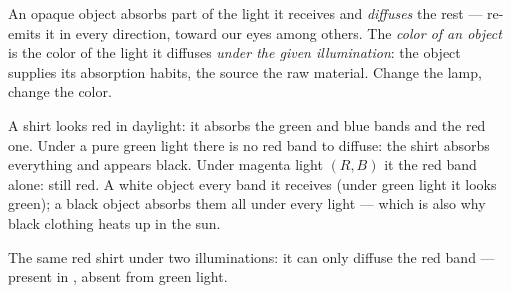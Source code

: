 \begin{definition}\label{def:g11:color-light-sources:objectcolor}
An opaque object absorbs part of the light it receives and
\emph{diffuses} the rest --- re-emits it in every
direction, toward our eyes among others. The \emph{color of an
object} is the color of the light it diffuses
\emph{under the given illumination}: the object supplies its absorption
habits, the source the raw material. Change the lamp, change the color.
\end{definition}

\begin{example}\label{ex:g11:color-light-sources:redshirt}
A shirt looks red in daylight: it absorbs the green and blue bands and
 the red one. Under a pure green light there is no red band to
diffuse: the shirt absorbs everything and appears black. Under magenta
light $(R, B)$ it  the red band alone: still red. A white
object  every band it receives (under green light it looks
green); a black object absorbs them all under every light --- which is
also why black clothing heats up in the sun.
\end{example}

\begin{omfigure}
\qquad
{}

{\small The same red shirt under two illuminations: it can only diffuse
the red band --- present in , absent from green light.}
\end{omfigure}

